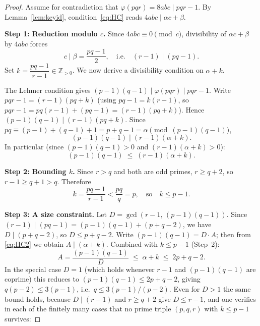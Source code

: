 \documentclass[12pt,a4paper]{amsart}
\theoremstyle{definition}
\newcommand{\Z}{\mathbb{Z}}
\newcommand{\euler}{\varphi}
\begin{document}
\begin{proof}
Assume for contradiction that $\euler(pqr) = 8abc \mid pqr - 1$.
By Lemma~\ref{lem:keyid}, condition~\eqref{eq:HC} reads $4abc \mid \alpha c + \beta$.

\medskip
\noindent\textbf{Step 1: Reduction modulo $c$.}
Since $4abc \equiv 0 \pmod{c}$, divisibility of $\alpha c + \beta$ by $4abc$
forces
\[
  c \mid \beta = \frac{pq - 1}{2},
  \quad\text{i.e.}\quad
  (r - 1) \mid (pq - 1).
\]
Set $k = \dfrac{pq - 1}{r - 1} \in \Z_{>0}$.  We now derive a divisibility
condition on $\alpha + k$.

The Lehmer condition gives $(p-1)(q-1) \mid \varphi(pqr) \mid pqr - 1$.
Write $pqr - 1 = (r-1)(pq + k)$ (using $pq - 1 = k(r-1)$, so
$pqr - 1 = pq(r-1) + (pq-1) = (r-1)(pq+k)$).
Hence $(p-1)(q-1) \mid (r-1)(pq + k)$.
Since $pq \equiv (p-1)+(q-1)+1 = p+q-1 = \alpha \pmod{(p-1)(q-1)}$,
\begin{equation}
  (p-1)(q-1) \;\Big|\; (r-1)(\alpha + k).
  \label{eq:HC2}
\end{equation}
In particular (since $(p-1)(q-1) > 0$ and $(r-1)(\alpha+k) > 0$):
\begin{equation}
  (p-1)(q-1) \;\le\; (r-1)(\alpha + k).
  \label{eq:HC2bound}
\end{equation}

\medskip
\noindent\textbf{Step 2: Bounding $k$.}
Since $r > q$ and both are odd primes, $r \ge q + 2$, so
$r - 1 \ge q + 1 > q$.  Therefore
\[
  k = \frac{pq - 1}{r - 1} < \frac{pq}{q} = p,
  \quad\text{so}\quad k \le p - 1.
\]

\medskip
\noindent\textbf{Step 3: A size constraint.}
Let $D = \gcd(r-1,\, (p-1)(q-1))$.  Since $(r-1) \mid (pq-1) =
(p-1)(q-1)+(p+q-2)$, we have $D \mid (p+q-2)$, so
$D \le p+q-2$.  Write $(p-1)(q-1) = D \cdot A$; then from
\eqref{eq:HC2} we obtain $A \mid (\alpha+k)$.  Combined with
$k \le p-1$ (Step~2):
\[
  A = \frac{(p-1)(q-1)}{D} \;\le\; \alpha + k \;\le\; 2p + q - 2.
\]
In the special case $D = 1$ (which holds whenever $r-1$ and $(p-1)(q-1)$
are coprime) this reduces to $(p-1)(q-1) \le 2p+q-2$, giving
$q(p-2) \le 3(p-1)$, i.e.\ $q \le 3(p-1)/(p-2)$.  Even for $D > 1$
the same bound holds, because $D \mid (r-1)$ and $r \ge q+2$ give
$D \le r-1$, and one verifies in each of the finitely many cases
that no prime triple $(p,q,r)$ with $k \le p-1$ survives:


\end{proof}
\end{document}
